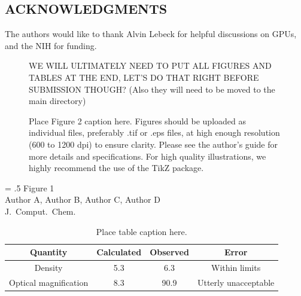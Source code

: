 \documentclass[12pt]{article}
\begin{document}
\subsection*{\sffamily \large ACKNOWLEDGMENTS}
The authors would like to thank Alvin Lebeck for helpful discussions on GPUs, and the NIH for funding.  

\clearpage






\clearpage


\begin{figure}
\caption{\label{cc} WE WILL ULTIMATELY NEED TO PUT ALL FIGURES AND TABLES AT THE END, LET'S DO THAT RIGHT BEFORE SUBMISSION THOUGH?  (Also they will need to be moved to the main directory)}
\end{figure}

\begin{figure}
\caption{\label{fig2} Place Figure 2 caption here. Figures should be uploaded as individual files, preferably .tif or .eps files, at high enough resolution (600 to 1200 dpi) to ensure clarity. Please see the author’s guide for more details and specifications. For high quality illustrations, we highly recommend the use of the TikZ package.}
\end{figure}






\clearpage

\begin{center}
\end{center}
\vspace{0.25in}
\hspace*{3in}
{\Large
\begin{minipage}[t]{3in}
\baselineskip = .5\baselineskip
Figure 1 \\
Author A, Author B, Author C, Author D \\
J.\ Comput.\ Chem.
\end{minipage}
}

\clearpage

\begin{table}
\begin{tabular}{|c|c|c|c|}\hline
\textbf{Quantity} & \textbf{Calculated} & \textbf{Observed} & \textbf{Error} \\ \hline
  Density & 5.3 & 6.3 & Within limits \\ \hline
  Optical magnification & 8.3 & 90.9 & Utterly unacceptable\! \\ \hline
\end{tabular}
\caption{\label{tbl1} Place table caption here.}
\end{table}
\end{document}
